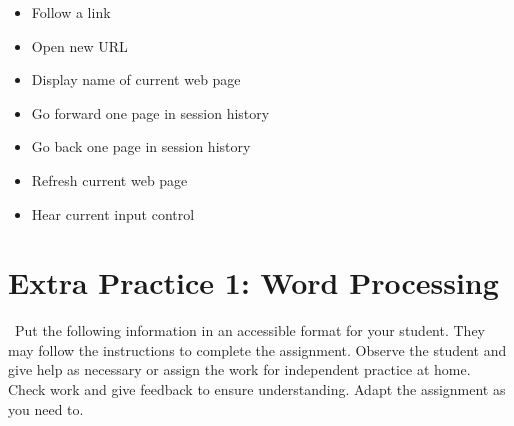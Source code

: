 \documentclass[10pt,letterpaper,twoside]{report}
\begin{document}
\begin{enumerate}
\begin{itemize}
		      \item Follow a link 
		      \item Open new URL  
		      \item Display name of current web page 
		      \item Go forward one page in session history 
		      \item Go back one page in session history 
		      \item Refresh current web page 
		      \item Hear current input control 
	      \end{itemize}
\end{enumerate}
\clearpage
\section{Extra Practice 1: Word Processing }
\
Put the following information in an accessible format for your student. They may follow the instructions to complete the assignment. Observe the student and give help as necessary or assign the work for independent practice at home. Check work and give feedback to ensure understanding. Adapt the assignment as you need to.
\end{document}
